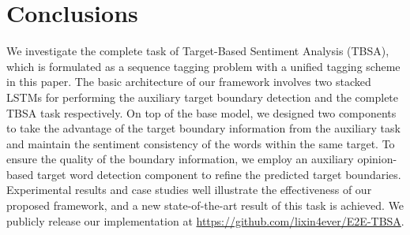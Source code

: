 \documentclass[letterpaper]{article} %
\begin{document}
\section{Conclusions}
We investigate the complete task of Target-Based Sentiment Analysis (TBSA), which is formulated as a sequence tagging problem with a unified tagging scheme in this paper. The basic architecture of our framework involves two stacked LSTMs for performing the auxiliary target boundary detection and the complete TBSA task respectively. On top of the base model, we designed two components to take the advantage of the target boundary information from the auxiliary task and maintain the sentiment consistency of the words within the same target. To ensure the quality of the boundary information, we employ an auxiliary opinion-based target word detection component to refine the predicted target boundaries. Experimental results and case studies well illustrate the effectiveness of our proposed framework, and a new state-of-the-art result of this task is achieved. We publicly release our implementation at \url{https://github.com/lixin4ever/E2E-TBSA}.



\end{document}
